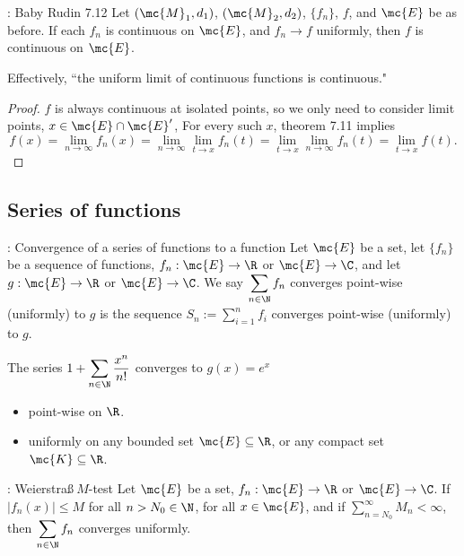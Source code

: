 \begin{ncorollary}{: Baby Rudin 7.12}
	Let \((\mc{M}_1,d_1)\), \((\mc{M}_2,d_2)\), \(\{f_n\}\), \(f\), and \(\mc{E}\) be as before. If each \(f_n\) is continuous on \(\mc{E}\), and \(f_n\to f\) uniformly, then \(f\) is continuous on \(\mc{E}\).
	
	\medskip
	
	Effectively, ``the uniform limit of continuous functions is continuous."
\end{ncorollary}
\begin{proof}
	\(f\) is always continuous at isolated points, so we only need to consider limit points, \(x\in\mc{E}\cap\mc{E}'\), For every such \(x\), theorem 7.11 implies 
	\begin{equation*}
		f(x)=\lim_{n\to\infty}f_n(x)=\lim_{n\to\infty}\lim_{t\to x}f_n(t)=\lim_{t\to x}\lim_{n\to\infty}f_n(t)=\lim_{t\to x}f(t).
	\end{equation*}
\end{proof}

\subsection{Series of functions}
\begin{ndef}{: Convergence of a series of functions to a function}
	Let \(\mc{E}\) be a set, let \(\{f_n\}\) be a sequence of functions, \(f_n:\mc{E}\to\R\) or \(\mc{E}\to\C\), and let \(g:\mc{E}\to\R\) or \(\mc{E}\to\C\). We say \(\displaystyle\sum_{n\in\N} f_n\) converges point-wise (uniformly) to \(g\) is the sequence \(S_n:=\sum_{i=1}^{n}f_i\) converges point-wise (uniformly) to \(g\).
\end{ndef}
\begin{example}
	The series \(1+\displaystyle\sum_{n\in\N}\frac{x^n}{n!}\) converges to \(g(x)=e^x\)
	\begin{itemize}
		\item point-wise on \(\R\).
		
		\item uniformly on any bounded set \(\mc{E}\subseteq\R\), or any compact set \(\mc{K}\subseteq\R\).
	\end{itemize}
\end{example}

\begin{ntheorem}{: Weierstra\ss \(~M\)-test}
	Let \(\mc{E}\) be a set, \(f_n:\mc{E}\to\R\) or \(\mc{E}\to\C\). If \(|f_n(x)|\leq M\) for all \(n>N_0\in\N\), for all \(x\in\mc{E}\), and if \(\displaystyle\sum_{n=N_0}^{\infty}M_n<\infty\), then \(\displaystyle\sum_{n\in\N}f_n\) converges uniformly.
\end{ntheorem}